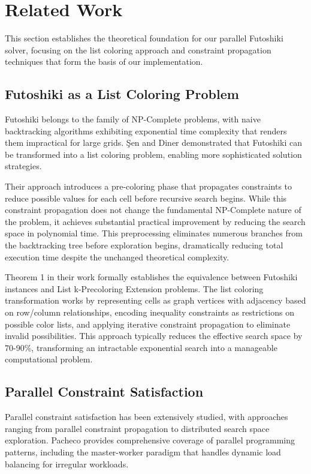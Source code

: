 \section{Related Work}
\label{sec:related_work}
This section establishes the theoretical foundation for our parallel Futoshiki solver, focusing on the list coloring approach and constraint propagation techniques that form the basis of our implementation.

\subsection{Futoshiki as a List Coloring Problem}
\label{subsec:list_coloring_foundation}
Futoshiki belongs to the family of NP-Complete problems, with naive backtracking algorithms exhibiting exponential time complexity that renders them impractical for large grids. Şen and Diner \cite{Sen2024Futoshiki} demonstrated that Futoshiki can be transformed into a list coloring problem, enabling more sophisticated solution strategies.

Their approach introduces a pre-coloring phase that propagates constraints to reduce possible values for each cell before recursive search begins. While this constraint propagation does not change the fundamental NP-Complete nature of the problem, it achieves substantial practical improvement by reducing the search space in polynomial time. This preprocessing eliminates numerous branches from the backtracking tree before exploration begins, dramatically reducing total execution time despite the unchanged theoretical complexity.

Theorem 1 in their work formally establishes the equivalence between Futoshiki instances and List k-Precoloring Extension problems. The list coloring transformation works by representing cells as graph vertices with adjacency based on row/column relationships, encoding inequality constraints as restrictions on possible color lists, and applying iterative constraint propagation to eliminate invalid possibilities. This approach typically reduces the effective search space by 70-90\%, transforming an intractable exponential search into a manageable computational problem.

\subsection{Parallel Constraint Satisfaction}
\label{subsec:parallel_csp}
Parallel constraint satisfaction has been extensively studied, with approaches ranging from parallel constraint propagation to distributed search space exploration. Pacheco \cite{Pacheco2011} provides comprehensive coverage of parallel programming patterns, including the master-worker paradigm that handles dynamic load balancing for irregular workloads.

